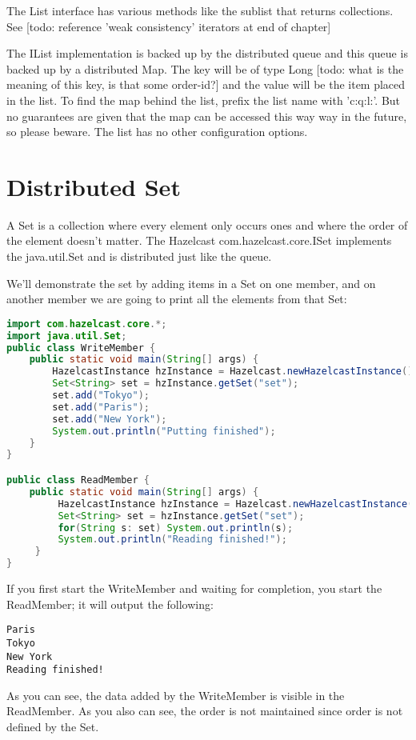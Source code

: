 The List interface has various methods like the sublist that returns collections. See [todo: reference 'weak consistency' iterators at end of chapter]

The IList implementation is backed up by the distributed queue and this queue is backed up by a distributed Map. The key will be of type Long [todo: what is the meaning of this key, is that some order-id?] and the value will be the item placed in the list. To find the map behind the list, prefix the list name with 'c:q:l:'. But no guarantees are given that the map can be accessed this way way in the future, so please beware. The list has no other configuration options.

\section{Distributed Set}
A Set is a collection where every element only occurs ones and where the order of the element doesn't matter. The Hazelcast com.hazelcast.core.ISet implements the java.util.Set and is distributed just like the queue.

We'll demonstrate the set by adding items in a Set on one member, and on another member we are going to print all the elements from that Set:
\begin{lstlisting}[language=java]
import com.hazelcast.core.*;
import java.util.Set;
public class WriteMember {
    public static void main(String[] args) {
        HazelcastInstance hzInstance = Hazelcast.newHazelcastInstance();
        Set<String> set = hzInstance.getSet("set");
        set.add("Tokyo");
        set.add("Paris");
        set.add("New York");
        System.out.println("Putting finished");
    }
}

public class ReadMember {
    public static void main(String[] args) {
         HazelcastInstance hzInstance = Hazelcast.newHazelcastInstance();
         Set<String> set = hzInstance.getSet("set");
         for(String s: set) System.out.println(s);
         System.out.println("Reading finished!");
     }
}
\end{lstlisting}
If you first start the WriteMember and waiting for completion, you start the ReadMember; it will output the following:
\begin{lstlisting}
Paris
Tokyo
New York
Reading finished!	
\end{lstlisting}
As you can see, the data added by the WriteMember is visible in the ReadMember. As you also can see, the order is not maintained since order is not defined by the Set.

